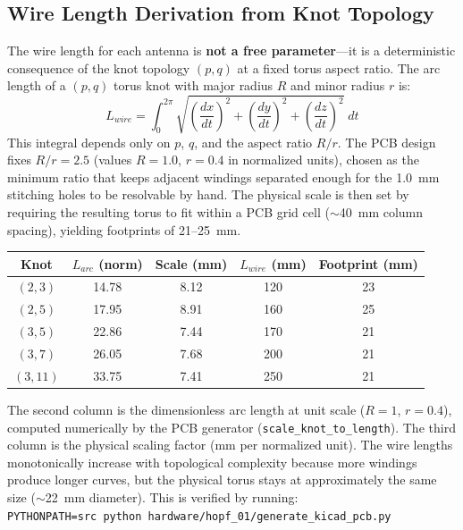 \subsection{Wire Length Derivation from Knot Topology}

The wire length for each antenna is \textbf{not a free parameter}---it is a deterministic consequence of the knot topology $(p,q)$ at a fixed torus aspect ratio. The arc length of a $(p,q)$ torus knot with major radius $R$ and minor radius $r$ is:
\begin{equation}
    L_{wire} = \int_0^{2\pi} \sqrt{\left(\frac{dx}{dt}\right)^2 + \left(\frac{dy}{dt}\right)^2 + \left(\frac{dz}{dt}\right)^2}\; dt
    \label{eq:arc_length}
\end{equation}
This integral depends only on $p$, $q$, and the aspect ratio $R/r$. The PCB design fixes $R/r = 2.5$ (values $R = 1.0$, $r = 0.4$ in normalized units), chosen as the minimum ratio that keeps adjacent windings separated enough for the 1.0~mm stitching holes to be resolvable by hand. The physical scale is then set by requiring the resulting torus to fit within a PCB grid cell ($\sim$40~mm column spacing), yielding footprints of 21--25~mm.

\begin{center}
\begin{tabular}{|c|c|c|c|c|}
\hline
Knot & $L_{arc}$ (norm) & Scale (mm) & $L_{wire}$ (mm) & Footprint (mm) \\ \hline
$(2,3)$  & 14.78 & 8.12 & 120 & 23 \\
$(2,5)$  & 17.95 & 8.91 & 160 & 25 \\
$(3,5)$  & 22.86 & 7.44 & 170 & 21 \\
$(3,7)$  & 26.05 & 7.68 & 200 & 21 \\
$(3,11)$ & 33.75 & 7.41 & 250 & 21 \\ \hline
\end{tabular}
\end{center}

\noindent The second column is the dimensionless arc length at unit scale ($R=1$, $r=0.4$), computed numerically by the PCB generator (\texttt{scale\_knot\_to\_length}). The third column is the physical scaling factor (mm per normalized unit). The wire lengths monotonically increase with topological complexity because more windings produce longer curves, but the physical torus stays at approximately the same size ($\sim$22~mm diameter). This is verified by running:\\[4pt]
\texttt{PYTHONPATH=src python hardware/hopf\_01/generate\_kicad\_pcb.py}

